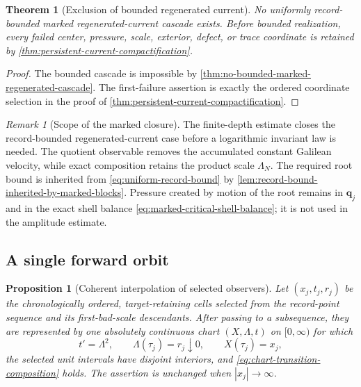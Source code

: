 \documentclass[11pt]{amsart}
\numberwithin{equation}{section}
\theoremstyle{plain}
\newtheorem{theorem}{Theorem}[section]
\newtheorem{proposition}[proposition]{Proposition}
\theoremstyle{definition}
\theoremstyle{remark}
\newtheorem{remark}[remark]{Remark}
\begin{document}
\begin{theorem}[Exclusion of bounded regenerated current]
\label{thm:marked-regenerated-current-exclusion}
No uniformly record-bounded marked regenerated-current cascade exists.
Before bounded realization, every failed center, pressure, scale, exterior,
defect, or trace coordinate is retained by
\cref{thm:persistent-current-compactification}.
\end{theorem}

\begin{proof}
The bounded cascade is impossible by
\cref{thm:no-bounded-marked-regenerated-cascade}.  The first-failure assertion
is exactly the ordered coordinate selection in the proof of
\cref{thm:persistent-current-compactification}.
\end{proof}

\begin{remark}[Scope of the marked closure]
The finite-depth estimate closes the record-bounded regenerated-current case
before a logarithmic invariant law is needed.  The quotient observable removes
the accumulated constant Galilean velocity, while exact composition retains
the product scale \(\Lambda_N\).  The required root bound is inherited from
\eqref{eq:uniform-record-bound} by
\cref{lem:record-bound-inherited-by-marked-blocks}.  Pressure created by motion of the root
remains in \(\mathbf q_j\) and in the exact shell balance
\eqref{eq:marked-critical-shell-balance}; it is not used in the amplitude
estimate.
\end{remark}

\subsection{A single forward orbit}
\label{app:single-forward-orbit}

\begin{proposition}[Coherent interpolation of selected observers]
\label{prop:coherent-observer-interpolation}
Let \((x_j,t_j,r_j)\) be the chronologically ordered, target-retaining cells
selected from the record-point sequence and its first-bad-scale descendants.
After passing to a subsequence, they are represented by one absolutely
continuous chart \((X,\Lambda,t)\) on \([0,\infty)\) for which
\[
 t'=\Lambda^2,\qquad \Lambda(\tau_j)=r_j\downarrow0,
 \qquad X(\tau_j)=x_j,
\]
the selected unit intervals have disjoint interiors, and
\eqref{eq:chart-transition-composition} holds.  The assertion is unchanged
when \(|x_j|\to\infty\).
\end{proposition}
\end{document}
